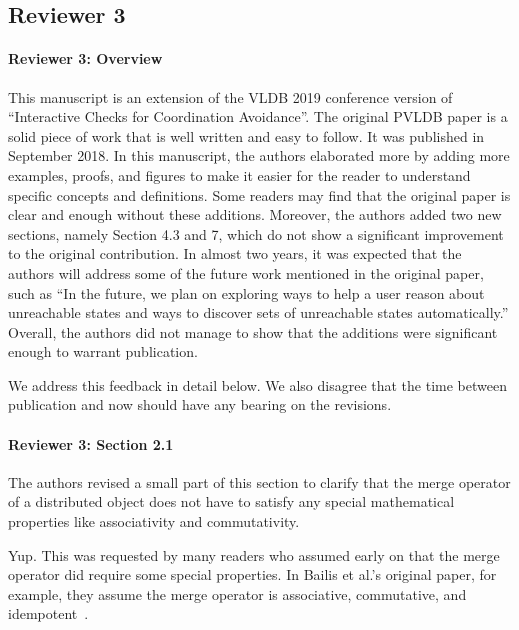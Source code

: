 \documentclass[9pt]{article}
\begin{document}
\begin{multicols*}{2}
\section*{Reviewer 3}
\paragraph{Reviewer 3: Overview}
\begin{feedback}
  This manuscript is an extension of the VLDB 2019 conference version of
  ``Interactive Checks for Coordination Avoidance''. The original PVLDB paper
  is a solid piece of work that is well written and easy to follow. It was
  published in September 2018. In this manuscript, the authors elaborated more
  by adding more examples, proofs, and figures to make it easier for the reader
  to understand specific concepts and definitions. Some readers may find that
  the original paper is clear and enough without these additions. Moreover, the
  authors added two new sections, namely Section 4.3 and 7, which do not show a
  significant improvement to the original contribution. In almost two years, it
  was expected that the authors will address some of the future work mentioned
  in the original paper, such as ``In the future, we plan on exploring ways to
  help a user reason about unreachable states and ways to discover sets of
  unreachable states automatically.'' Overall, the authors did not manage to
  show that the additions were significant enough to warrant publication.
\end{feedback}
We address this feedback in detail below. We also disagree that the time
between publication and now should have any bearing on the revisions.

\paragraph{Reviewer 3: Section 2.1}
\begin{feedback}
  The authors revised a small part of this section to clarify that the merge
  operator of a distributed object does not have to satisfy any special
  mathematical properties like associativity and commutativity.
\end{feedback}
Yup. This was requested by many readers who assumed early on that the merge
operator did require some special properties. In Bailis et al.'s original
paper, for example, they assume the merge operator is associative, commutative,
and idempotent~\cite{bailis2014coordination}.


\end{multicols*}
\end{document}
